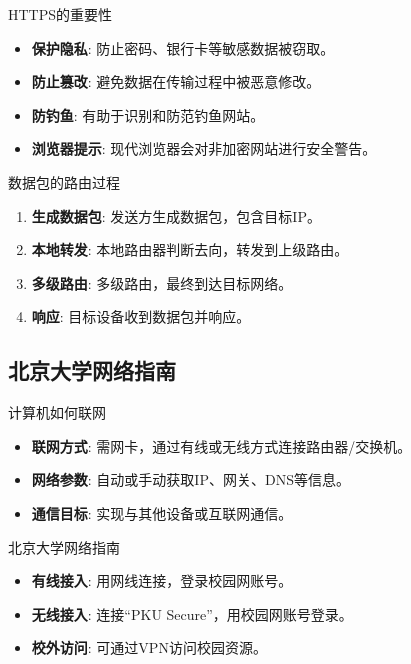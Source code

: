 \documentclass{beamer}
\begin{document}
\begin{frame}{HTTPS的重要性}
\begin{itemize}
    \item \textbf{保护隐私}: 防止密码、银行卡等敏感数据被窃取。
    \item \textbf{防止篡改}: 避免数据在传输过程中被恶意修改。
    \item \textbf{防钓鱼}: 有助于识别和防范钓鱼网站。
    \item \textbf{浏览器提示}: 现代浏览器会对非加密网站进行安全警告。
    \end{itemize}
\end{frame}

\begin{frame}{数据包的路由过程}
\begin{enumerate}
    \item \textbf{生成数据包}: 发送方生成数据包，包含目标IP。
    \item \textbf{本地转发}: 本地路由器判断去向，转发到上级路由。
    \item \textbf{多级路由}: 多级路由，最终到达目标网络。
    \item \textbf{响应}: 目标设备收到数据包并响应。
\end{enumerate}
\end{frame}

\subsection{北京大学网络指南}

\begin{frame}{计算机如何联网}
\begin{itemize}
    \item \textbf{联网方式}: 需网卡，通过有线或无线方式连接路由器/交换机。
    \item \textbf{网络参数}: 自动或手动获取IP、网关、DNS等信息。
    \item \textbf{通信目标}: 实现与其他设备或互联网通信。
\end{itemize}
\end{frame}

\begin{frame}{北京大学网络指南}
\begin{itemize}
    \item \textbf{有线接入}: 用网线连接，登录校园网账号。
    \item \textbf{无线接入}: 连接“PKU Secure”，用校园网账号登录。
    \item \textbf{校外访问}: 可通过VPN访问校园资源。
\end{itemize}
\end{frame}
\end{document}
